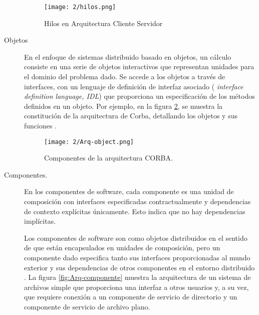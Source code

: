 \begin{description}
	\begin{figure}%
		\texttt{[image: 2/hilos.png]}
		\caption{Hilos en Arquitectura Cliente Servidor}
		\label{fig:Arq-hilos}
	\end{figure}
	
	\item[Objetos]   En el enfoque de sistemas distribuido basado en \gls{objetos}, un cálculo consiste en una serie de objetos interactivos que representan unidades  para el dominio del problema dado. Se accede a los objetos a través de interfaces, con un lenguaje de definición de interfaz asociado ( \textit{interface definition language, IDL}) que proporciona un especificación de los métodos definidos en un objeto. 
	 
	Por ejemplo, en la figura \ref{fig:Arq-object}, se muestra la constituci\'on de la arquitectura de \gls{Corba}, detallando los objetos y sus funciones . 

	\begin{figure}%
		\texttt{[image: 2/Arq-object.png]}
		\caption{Componentes de la arquitectura CORBA.}
		\label{fig:Arq-object}
	\end{figure}
	
	\item [Componentes.]  
	
	En los \gls{componentes} de software, cada componente es  una unidad de composición con interfaces especificadas contractualmente y dependencias de contexto explícitas únicamente. Esto indica que no hay dependencias implícitas. 
	
	Los componentes de software son como objetos distribuidos en el sentido de que están encapsulados en 	unidades de composición, pero un componente dado especifica tanto sus interfaces proporcionadas al mundo exterior y sus dependencias de otros componentes en el entorno distribuido  .	
	La figura \ref{fig:Arq-componente} muestra la arquitectura de un sistema de archivos simple que proporciona una interfaz a otros usuarios y, a su vez, 	que requiere conexión a un componente de servicio de directorio y un componente de servicio de archivo plano.
	

\end{description}
